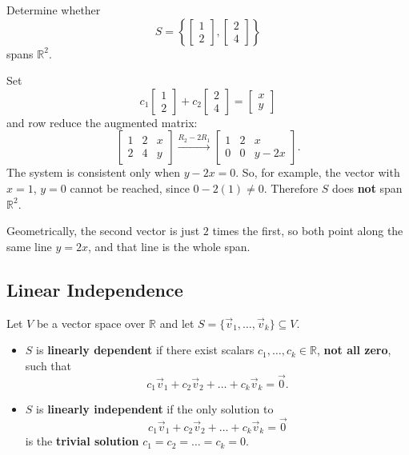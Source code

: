 \begin{example}
Determine whether
\[
S = \left\{ \begin{bmatrix} 1 \\ 2 \end{bmatrix}, \begin{bmatrix} 2 \\ 4 \end{bmatrix} \right\}
\]
spans $\mathbb{R}^2$.

\begin{solution}
Set
\[
c_1 \begin{bmatrix} 1 \\ 2 \end{bmatrix} + c_2 \begin{bmatrix} 2 \\ 4 \end{bmatrix} = \begin{bmatrix} x \\ y \end{bmatrix}
\]
and row reduce the augmented matrix:
\[
\left[\begin{array}{cc|c} 1 & 2 & x \\ 2 & 4 & y \end{array}\right]
\xrightarrow{R_2 - 2R_1}
\left[\begin{array}{cc|c} 1 & 2 & x \\ 0 & 0 & y - 2x \end{array}\right].
\]
The system is consistent only when $y - 2x = 0$. So, for example, the vector with $x = 1$, $y = 0$ cannot be reached, since $0 - 2(1) \neq 0$. Therefore $S$ does \textbf{not} span $\mathbb{R}^2$.

Geometrically, the second vector is just $2$ times the first, so both point along the same line $y = 2x$, and that line is the whole span.
\end{solution}
\end{example}

\subsection{Linear Independence}

\begin{definition}
Let $V$ be a vector space over $\mathbb{R}$ and let $S = \{\vec{v}_1, \dots, \vec{v}_k\} \subseteq V$.
\begin{itemize}
    \item $S$ is \textbf{linearly dependent} if there exist scalars $c_1, \dots, c_k \in \mathbb{R}$, \textbf{not all zero}, such that
    \[
    c_1\vec{v}_1 + c_2\vec{v}_2 + \dots + c_k\vec{v}_k = \vec{0}.
    \]
    \item $S$ is \textbf{linearly independent} if the only solution to
    \[
    c_1\vec{v}_1 + c_2\vec{v}_2 + \dots + c_k\vec{v}_k = \vec{0}
    \]
    is the \textbf{trivial solution} $c_1 = c_2 = \dots = c_k = 0$.
\end{itemize}
\end{definition}

